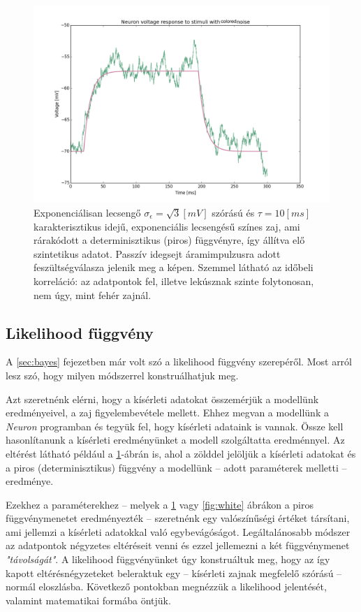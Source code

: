 \begin{figure}[h!]
	\centering
	\includegraphics[width=\textwidth]{./fig/noise/colored_noise.png}
	\caption[Színes zaj]{Exponenciálisan lecsengő $\sigma_\epsilon = \sqrt{3} \left[mV\right]$ szórású és $\tau = 10[ms]$ karakterisztikus idejű, exponenciális lecsengésű színes zaj, ami rárakódott a determinisztikus (piros) függvényre, így állítva elő szintetikus adatot. Passzív idegsejt áramimpulzusra adott feszültségválasza jelenik meg a képen. Szemmel látható az időbeli korreláció: az adatpontok fel, illetve lekúsznak szinte folytonosan, nem úgy, mint fehér zajnál.}%
	\label{fig:colored}
\end{figure}




\subsection{Likelihood függvény}\label{sec:likelihood}
A  \ref{sec:bayes} fejezetben már volt szó a likelihood függvény szerepéről. Most arról lesz szó, hogy milyen módszerrel konstruálhatjuk meg.

Azt szeretnénk elérni, hogy a kísérleti adatokat összemérjük a modellünk eredményeivel, a zaj figyelembevétele mellett. Ehhez megvan a modellünk a \textit{Neuron} programban és tegyük fel, hogy kísérleti adataink is vannak. Össze kell hasonlítanunk a kísérleti eredményünket a modell szolgáltatta eredménnyel. Az eltérést látható például a \ref{fig:colored}-ábrán is, ahol a zölddel jelöljük a kísérleti adatokat és a piros (determinisztikus) függvény a modellünk -- adott paraméterek melletti -- eredménye.

Ezekhez a paraméterekhez  -- melyek a \ref{fig:colored} vagy \ref{fig:white} ábrákon a piros függvénymenetet eredményezték -- szeretnénk egy valószínűségi értéket társítani, ami jellemzi a kísérleti adatokkal való egybevágóságot. Legáltalánosabb módszer az adatpontok négyzetes eltéréseit venni és ezzel jellemezni a két függvénymenet \textit{"távolságát"}. A likelihood függvényünket úgy konstruáltuk meg, hogy az így kapott eltérésnégyzeteket beleraktuk egy -- kísérleti zajnak megfelelő szórású -- normál eloszlásba. Következő pontokban megnézzük a likelihood jelentését, valamint matematikai formába öntjük.

